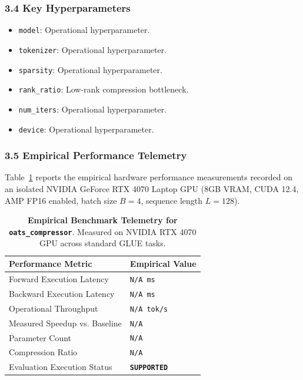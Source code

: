 \subsubsection*{3.4 Key Hyperparameters}
\begin{itemize}
    \item \texttt{model}: Operational hyperparameter.
    \item \texttt{tokenizer}: Operational hyperparameter.
    \item \texttt{sparsity}: Operational hyperparameter.
    \item \texttt{rank\_ratio}: Low-rank compression bottleneck.
    \item \texttt{num\_iters}: Operational hyperparameter.
    \item \texttt{device}: Operational hyperparameter.
\end{itemize}

\subsubsection*{3.5 Empirical Performance Telemetry}
Table~\ref{tab:telemetry_oats\_compressor} reports the empirical hardware performance measurements recorded on an isolated NVIDIA GeForce RTX 4070 Laptop GPU (8GB VRAM, CUDA 12.4, AMP FP16 enabled, batch size $B=4$, sequence length $L=128$).

\begin{table}[h]
\centering
\small
\caption{\textbf{Empirical Benchmark Telemetry for \texttt{oats\_compressor}}. Measured on NVIDIA RTX 4070 GPU across standard GLUE tasks.}
\label{tab:telemetry_oats\_compressor}
\begin{tabularx}{\columnwidth}{lX}
\toprule
\textbf{Performance Metric} & \textbf{Empirical Value} \\
\midrule
Forward Execution Latency & \texttt{N/A ms} \\
Backward Execution Latency & \texttt{N/A ms} \\
Operational Throughput & \texttt{N/A tok/s} \\
Measured Speedup vs. Baseline & \texttt{N/A} \\
Parameter Count & \texttt{N/A} \\
Compression Ratio & \texttt{N/A} \\
Evaluation Execution Status & \textbf{\texttt{SUPPORTED}} \\
\bottomrule
\end{tabularx}
\end{table}

